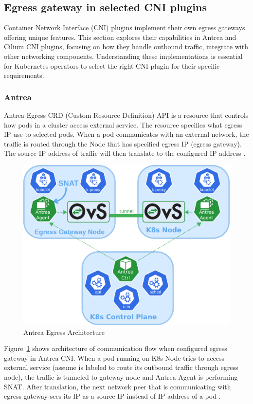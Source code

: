 \subsection{Egress gateway in selected CNI plugins}
\label{subsection:egressGateway}

Container Network Interface (CNI) plugins implement their own egress gateways offering unique features. This section explores their capabilities in Antrea and Cilium CNI plugins, focusing on how they handle outbound traffic, integrate with other networking components. Understanding these implementations is essential for Kubernetes operators to select the right CNI plugin for their specific requirements.


\subsubsection{Antrea}
\label{subsection:antreaEgress}

Antrea Egress CRD (Custom Resource Definition) API is a resource that controls how pods in a cluster access external service. The resource specifies what egress IP use to selected pods. When a pod communicates with an external network, the traffic is routed through the Node that has specified egress IP (egress gateway). The source IP address of traffic will then translate to the configured IP address \cite{AntreaEgressArch}.

\begin{figure}[tbh]
    \centering
    \includegraphics[width=0.6\columnwidth]{images/antrea_overview.png}
    \caption{Antrea Egress Architecture \cite{AntreaEgressArch}}
    \label{fig:antreaEgressArch}
\end{figure}


Figure~\ref{fig:antreaEgressArch} shows architecture of communication flow when configured egress gateway in Antrea CNI. When a pod running on K8s Node tries to access external service (assume is labeled to route its outbound traffic through egress node), the traffic is tunneled to gateway node and Antrea Agent is performing SNAT. After translation, the next network peer that is communicating with egress gateway sees its IP as a source IP instead of IP address of a pod \cite{AntreaEgressArch} \cite{AntreaSNAT} \cite{AntreaArch}. 

